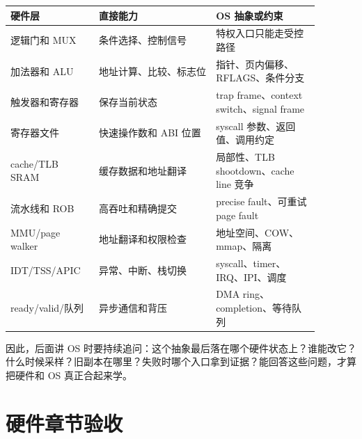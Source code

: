 \begin{longtable}{p{0.24\linewidth}p{0.34\linewidth}p{0.30\linewidth}}
\toprule
硬件层 & 直接能力 & OS 抽象或约束 \\
\midrule
逻辑门和 MUX & 条件选择、控制信号 & 特权入口只能走受控路径 \\
加法器和 ALU & 地址计算、比较、标志位 & 指针、页内偏移、RFLAGS、条件分支 \\
触发器和寄存器 & 保存当前状态 & trap frame、context switch、signal frame \\
寄存器文件 & 快速操作数和 ABI 位置 & syscall 参数、返回值、调用约定 \\
cache/TLB SRAM & 缓存数据和地址翻译 & 局部性、TLB shootdown、cache line 竞争 \\
流水线和 ROB & 高吞吐和精确提交 & precise fault、可重试 page fault \\
MMU/page walker & 地址翻译和权限检查 & 地址空间、COW、mmap、隔离 \\
IDT/TSS/APIC & 异常、中断、栈切换 & syscall、timer、IRQ、IPI、调度 \\
ready/valid/队列 & 异步通信和背压 & DMA ring、completion、等待队列 \\
\bottomrule
\end{longtable}

因此，后面讲 OS 时要持续追问：这个抽象最后落在哪个硬件状态上？谁能改它？什么时候采样？旧副本在哪里？失败时哪个入口拿到证据？能回答这些问题，才算把硬件和 OS 真正合起来学。

\section{硬件章节验收}


